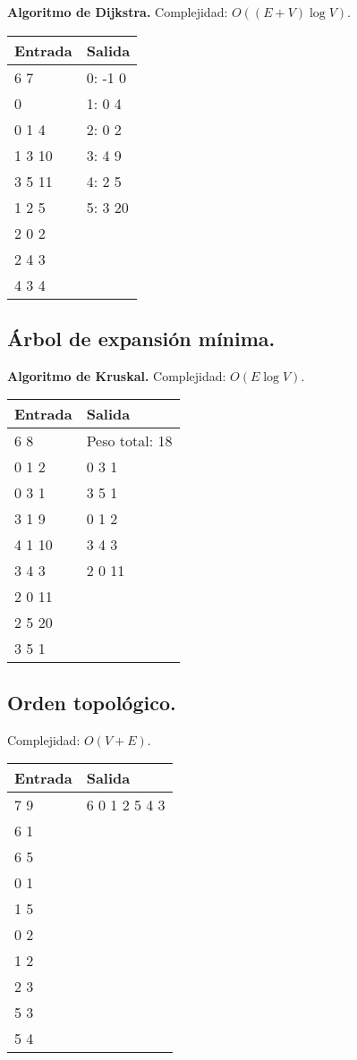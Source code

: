 \documentclass[10pt, letterpaper, twoside]{article}
\begin{document}
\textbf{Algoritmo de Dijkstra.} Complejidad: $O((E + V) \log V)$.



\begin{tabular}{|p{7cm}|p{7cm}|}
\hline
\textbf{Entrada} & \textbf{Salida} \\ \hline
6 7    & 0: -1 0 \\
0      & 1: 0 4  \\ 
0 1 4  & 2: 0 2  \\
1 3 10 & 3: 4 9  \\
3 5 11 & 4: 2 5  \\
1 2 5  & 5: 3 20 \\
2 0 2  & \\
2 4 3  & \\
4 3 4  & \\ \hline
\end{tabular}

\subsection{Árbol de expansión mínima.}

\textbf{Algoritmo de Kruskal.} Complejidad: $O(E \log V)$.



\begin{tabular}{|p{7cm}|p{7cm}|}
\hline
\textbf{Entrada} & \textbf{Salida} \\ \hline
6 8    & Peso total: 18 \\
0 1 2  & 0 3 1 \\
0 3 1  & 3 5 1 \\
3 1 9  & 0 1 2 \\
4 1 10 & 3 4 3 \\
3 4 3  & 2 0 11 \\
2 0 11 & \\
2 5 20 & \\
3 5 1  & \\ \hline
\end{tabular}

\subsection{Orden topológico.}

Complejidad: $O(V + E)$.



\begin{tabular}{|p{7cm}|p{7cm}|}
\hline
\textbf{Entrada} & \textbf{Salida} \\ \hline
7 9 & 6 0 1 2 5 4 3 \\
6 1 & \\
6 5 & \\
0 1 & \\
1 5 & \\
0 2 & \\
1 2 & \\
2 3 & \\
5 3 & \\ 
5 4 & \\ \hline
\end{tabular}
\end{document}
